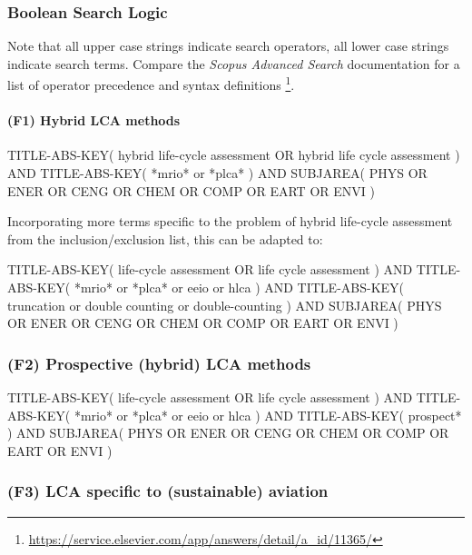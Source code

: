 \documentclass{article}
\begin{document}
    \subsubsection{Boolean Search Logic}
    \label{sub_boolean}
        
        Note that all upper case strings indicate search operators, all lower case strings indicate search terms. Compare the \textit{Scopus Advanced Search} documentation for a list of operator precedence and syntax definitions \footnote{\url{https://service.elsevier.com/app/answers/detail/a_id/11365/}}.
        
        \paragraph{(F1) Hybrid LCA methods}
            
\begin{code_search}
TITLE-ABS-KEY(
    {hybrid life-cycle assessment}
    OR
    {hybrid life cycle assessment}
)
AND TITLE-ABS-KEY(
    *mrio* or *plca*
)
AND SUBJAREA(
    PHYS OR ENER OR CENG OR CHEM OR COMP OR EART OR ENVI
)
\end{code_search}

Incorporating more terms specific to the problem of hybrid life-cycle assessment from the inclusion/exclusion list, this can be adapted to:

\begin{code_search}
TITLE-ABS-KEY(
    {life-cycle assessment}
    OR
    {life cycle assessment}
)
AND TITLE-ABS-KEY(
    *mrio* or *plca* or eeio or hlca
)
AND TITLE-ABS-KEY(
    {truncation} or {double counting} or {double-counting}
)
AND SUBJAREA(
    PHYS OR ENER OR CENG OR CHEM OR COMP OR EART OR ENVI
)
\end{code_search}

        \subsubsection{(F2) Prospective (hybrid) LCA methods}

\begin{code_search}
TITLE-ABS-KEY(
    {life-cycle assessment}
    OR
    {life cycle assessment}
)
AND TITLE-ABS-KEY(
    *mrio* or *plca* or eeio or hlca
)
AND TITLE-ABS-KEY(
    prospect*
)
AND SUBJAREA(
    PHYS OR ENER OR CENG OR CHEM OR COMP OR EART OR ENVI
)
\end{code_search}

        \subsubsection{(F3) LCA specific to (sustainable) aviation}
\end{document}
